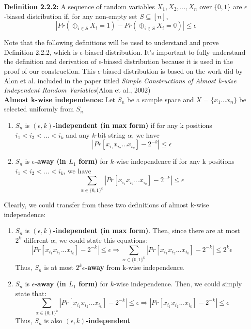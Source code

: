 \documentclass[a4paper, english]{paper}
\begin{document}
	\noindent\textbf{Definition 2.2.2: }
	A sequence of random variables $X_1,X_2,...,X_n$ over $\{0,1\}$ are $\epsilon$-biased distribution if, for any non-empty set $S\subseteq [n]$,
	$$|Pr(\oplus_{i\in S} X_i = 1)-Pr(\oplus_{i\in S} X_i = 0)|\le \epsilon$$
	
	\noindent Note that the following definitions will be used to understand and prove Definition 2.2.2, which is $\epsilon$-biased distribution. It's important to fully understand the definition and derivation of $\epsilon$-biased distribution because it is used in the proof of our construction. This $\epsilon$-biased distribution is based on the work did by Alon et al. included in the paper titled \textit{Simple Constructions of Almost k-wise Independent Random Variables}(Alon et al., 2002)\\

	\noindent\textbf{Almost k-wise independence:}
	Let $S_n$ be a sample space and $X=\{x_1...x_n\}$ be selected uniformly from $S_n$
	\begin{enumerate}
	\item $S_n$ is  \textbf{$(\epsilon,k)$-independent (in max form)} if for any k positions $i_1<i_2<...<i_k$ and any $k$-bit string $\alpha$, we have
		$$|Pr[x_{i_1}x_{i_2}...x_{i_k}]-2^{-k}|\le \epsilon$$
	\item $S_n$ is \textbf{$\epsilon$-away (in $L_1$ form)} for $k$-wise independence if for any k positions $i_1<i_2<...<i_k$, we have
		$$\sum_{\alpha\in\{0,1\}^k}|Pr[x_{i_1}x_{i_2}...x_{i_k}]-2^{-k}| \le \epsilon$$
	\end{enumerate}
	Clearly, we could transfer from these two definitions of almost k-wise independence:
	\begin{enumerate}
	\item $S_n$ is  \textbf{$(\epsilon,k)$-independent (in max form)}. Then, since there are at most $2^k$ different $\alpha$, we could state this equations:
$$|Pr[x_{i_1}x_{i_2}...x_{i_k}]-2^{-k}|\le \epsilon \Rightarrow \sum_{\alpha\in\{0,1\}^k}|Pr[x_{i_1}x_{i_2}...x_{i_k}]-2^{-k}| \le 2^k\epsilon$$
	Thus, $S_n$ is at most \textbf{$2^k\epsilon$-away} from k-wise independence.
	\item $S_n$ is \textbf{$\epsilon$-away (in $L_1$ form)} for $k$-wise independence. Then, we could simply state that:
$$\sum_{\alpha\in\{0,1\}^k}|Pr[x_{i_1}x_{i_2}...x_{i_k}]-2^{-k}| \le \epsilon \Rightarrow |Pr[x_{i_1}x_{i_2}...x_{i_k}]-2^{-k}|\le \epsilon $$
	Thus, $S_n$ is also \textbf{$(\epsilon,k)$-independent}
	\end{enumerate}
		
\end{document}
